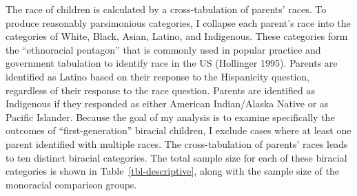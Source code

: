 \documentclass[
  letterpaper,
  DIV=11,
  numbers=noendperiod]{scrartcl}
\begin{document}
The race of children is calculated by a cross-tabulation of parents'
races. To produce reasonably parsimonious categories, I collapse each
parent's race into the categories of White, Black, Asian, Latino, and
Indigenous. These categories form the ``ethnoracial pentagon'' that is
commonly used in popular practice and government tabulation to identify
race in the US (Hollinger 1995). Parents are identified as Latino based
on their response to the Hispanicity question, regardless of their
response to the race question. Parents are identified as Indigenous if
they responded as either American Indian/Alaska Native or as Pacific
Islander. Because the goal of my analysis is to examine specifically the
outcomes of ``first-generation'' biracial children, I exclude cases
where at least one parent identified with multiple races. The
cross-tabulation of parents' races leads to ten distinct biracial
categories. The total sample size for each of these biracial categories
is shown in Table~\ref{tbl-descriptive}, along with the sample size of
the monoracial comparison groups.
\end{document}
